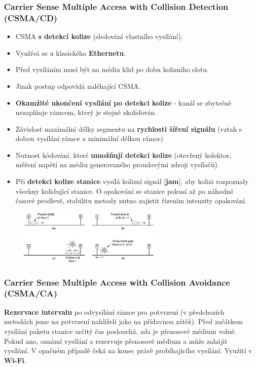 \subsubsection{Carrier Sense Multiple Access with Collision Detection (CSMA/CD)}
\begin{itemize}
\item CSMA \textbf{s detekcí kolize} (sledování vlastního vysílání).
\item Využívá se u klasického \textbf{Ethernetu}.
\item Před vysíláním musí být na médiu klid po dobu kolizního slotu.
\item Jinak postup odpovídá naléhající CSMA.
\item \textbf{Okamžité ukončení vysílání po detekci kolize} - kanál se zbytečně nezaplňuje rámcem, který je stejně zkolidován.
\item Závislost maximální délky segmentu na \textbf{rychlosti šíření signálu} (vztah s dobou vysílání rámce a minimální délkou rámce)
\item Nutnost kódování, které \textbf{umožňují detekci kolize} (otevřený kolektor, měření napětí na médiu generovaného proudovými zdroji vysílačů).
\item Při \textbf{detekci kolize stanice }vysílá kolizní signál [\textbf{jam}], aby kolizi rozpoznaly všechny kolidující stanice. O opakování se stanice pokusí až po náhodné časové prodlevě, stabilitu metody nutno zajistit řízením intenzity opakování.
\end{itemize}

\begin{figure}[H]
	\centering
	\includegraphics[width=0.62\textwidth]{assets/csma-cd-casovani_kolize}
\end{figure}

\subsubsection{Carrier Sense Multiple Access with Collision Avoidance (CSMA/CA)}
\textbf{Rezervace intervalu} po odvysílání rámce pro potvrzení (v předchozích metodách jsme na potvrzení nahlíželi jako na  přídavnou zátěž). Před začátkem vysílání paketu stanice určitý čas poslouchá, zda je přenosové médium volné. Pokud ano, oznámí vysílání a rezervuje přenosové médium a může zahájit vysílání. V opačném případě čeká na konec právě probíhajícího vysílání. Využití v \textbf{Wi-Fi}.
